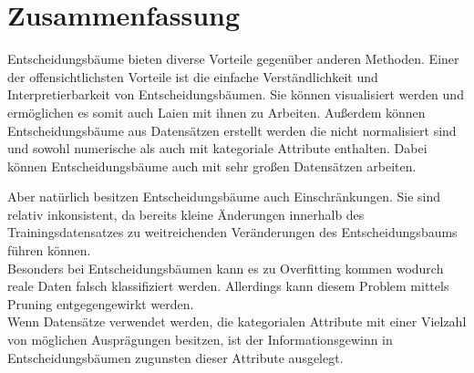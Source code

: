 \chapter{Zusammenfassung}
\label{zusammenfassung}

Entscheidungsbäume bieten diverse Vorteile gegenüber anderen Methoden. Einer der offensichtlichsten Vorteile ist die einfache Verständlichkeit und Interpretierbarkeit von Entscheidungsbäumen. \autocite{DataMining} Sie können visualisiert werden und ermöglichen es somit auch Laien mit ihnen zu Arbeiten. \autocite{Decision46:online} Außerdem können Entscheidungsbäume aus Datensätzen erstellt werden die nicht normalisiert sind und sowohl numerische als auch mit kategoriale Attribute enthalten. Dabei können Entscheidungsbäume auch mit sehr großen Datensätzen arbeiten. \autocite{Decision46:online}


Aber natürlich besitzen Entscheidungsbäume auch Einschränkungen. Sie sind relativ inkonsistent, da bereits kleine Änderungen innerhalb des Trainingsdatensatzes zu weitreichenden Veränderungen des Entscheidungsbaums führen können. \autocite{Decision46:online}\\
Besonders bei Entscheidungsbäumen kann es zu Overfitting kommen wodurch reale Daten falsch klassifiziert werden. Allerdings kann diesem Problem mittels Pruning entgegengewirkt werden. \autocite{DataMining}\\
Wenn Datensätze verwendet werden, die kategorialen Attribute mit einer Vielzahl von möglichen Ausprägungen besitzen, ist der Informationsgewinn in Entscheidungsbäumen zugunsten dieser Attribute ausgelegt.\autocite{Decision46:online}